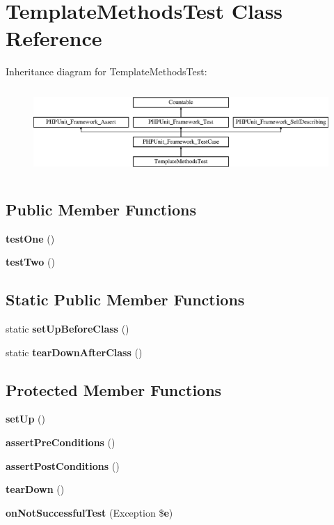 \section{Template\+Methods\+Test Class Reference}
\label{class_template_methods_test}
Inheritance diagram for Template\+Methods\+Test\+:\begin{figure}[H]
\begin{center}
\leavevmode
\includegraphics[height=3.303835cm]{class_template_methods_test}
\end{center}
\end{figure}
\subsection*{Public Member Functions}
\begin{DoxyCompactItemize}
\item 
{\bf test\+One} ()
\item 
{\bf test\+Two} ()
\end{DoxyCompactItemize}
\subsection*{Static Public Member Functions}
\begin{DoxyCompactItemize}
\item 
static {\bf set\+Up\+Before\+Class} ()
\item 
static {\bf tear\+Down\+After\+Class} ()
\end{DoxyCompactItemize}
\subsection*{Protected Member Functions}
\begin{DoxyCompactItemize}
\item 
{\bf set\+Up} ()
\item 
{\bf assert\+Pre\+Conditions} ()
\item 
{\bf assert\+Post\+Conditions} ()
\item 
{\bf tear\+Down} ()
\item 
{\bf on\+Not\+Successful\+Test} (Exception \${\bf e})
\end{DoxyCompactItemize}
